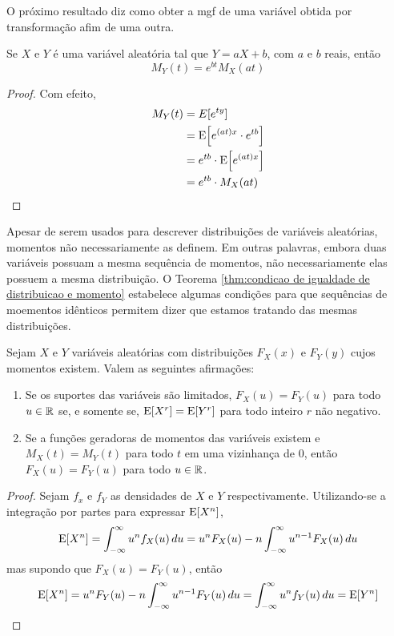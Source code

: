 O próximo resultado diz como obter a mgf de uma variável obtida por transformação afim
de uma outra.

\begin{prop:mgf da transformacao afim}
Se $X$ e $Y$ é uma variável aleatória tal que $Y = a X + b$, com $a$ e $b$ reais, então
\[
    M_Y(t) = e^{bt} M_X(at)
\]
\end{prop:mgf da transformacao afim}
\begin{proof}
Com efeito,
\begin{align*}
	M_Y(t) &= E[e^{ty}] \\
	&= \mathrm{E}\!\left[e^{(at)x} \cdot e^{tb}\right] \\
	&= e^{tb} \cdot \mathrm{E}\!\left[e^{(at)x}\right] \\
	&= e^{tb} \cdot M_X(at)
\end{align*}
\end{proof}

Apesar de serem usados para descrever distribuições de variáveis aleatórias, momentos
não necessariamente as definem.
Em outras palavras, embora duas variáveis possuam a mesma sequência de momentos, não
necessariamente elas possuem a mesma distribuição.
O Teorema \ref{thm:condicao de igualdade de distribuicao e momento} estabelece algumas
condições para que sequências de moementos idênticos permitem dizer que estamos tratando
das mesmas distribuições.

\begin{thm:condicao de igualdade de distribuicao e momento}
\label{thm:condicao de igualdade de distribuicao e momento}
Sejam $X$ e $Y$ variáveis aleatórias com distribuições $F_X(x)$ e $F_Y(y)$ cujos
momentos existem. Valem as seguintes afirmações:
\begin{enumerate}
\item Se os suportes das variáveis são limitados, $F_X(u) = F_Y(u)$ para todo $u \in \mathbb{R}$
se, e somente se, $\mathrm{E}\!\left[X^r\right] = \mathrm{E}\!\left[Y^r\right]$ para todo inteiro $r$ não negativo.

\item Se a funções geradoras de momentos das variáveis existem e $M_X(t) = M_Y(t)$ para
todo $t$ em uma vizinhança de $0$, então $F_X(u) = F_Y(u)$ para todo $u \in \mathbb{R}$.
\end{enumerate}
\end{thm:condicao de igualdade de distribuicao e momento}
\begin{proof}
Sejam $f_x$ e $f_Y$ as densidades de $X$ e $Y$ respectivamente.
Utilizando-se a integração por partes para expressar $\mathrm{E}\!\left[X^n\right]$,
\[
    \mathrm{E}\!\left[X^n\right] = \int_{-\infty}^\infty u^n f_X(u)\,du =
    u^n F_X(u) - n\int_{-\infty}^\infty u^{n-1} F_X(u)\,du
\]
mas supondo que $F_X(u) = F_Y(u)$, então
\[
    \mathrm{E}\!\left[X^n\right] = u^n F_Y(u) - n\int_{-\infty}^\infty u^{n-1} F_Y(u)\,du =
    \int_{-\infty}^\infty u^n f_Y(u)\,du =
    \mathrm{E}\!\left[Y^n\right]
\]
\end{proof}

